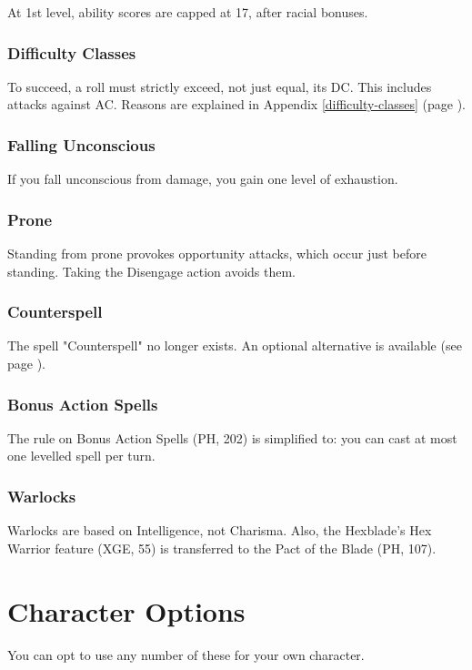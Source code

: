 \documentclass[letterpaper,twocolumn,openany,nodeprecatedcode,bg=print]{dndbook}
\newcommand{\pg}[1]{page \pageref{#1}}
\newcommand{\see}[1]{(see \pg{#1})}
\begin{document}
At 1st level, ability scores are capped at 17, after racial bonuses.

\subsection{Difficulty Classes}
To succeed, a roll must strictly exceed, not just equal, its DC. 
This includes attacks against AC. 
Reasons are explained in Appendix \ref{difficulty-classes} (\pg{difficulty-classes}).

\subsection{Falling Unconscious}
If you fall unconscious from damage, you gain one level of exhaustion.

\subsection{Prone}
Standing from prone provokes opportunity attacks, which occur just before standing. 
Taking the Disengage action avoids them.

\subsection{Counterspell}
The spell "Counterspell" no longer exists. 
An optional alternative is available \see{counterspell}.

\subsection{Bonus Action Spells}
The rule on Bonus Action Spells (PH, 202) is simplified to: 
you can cast at most one levelled spell per turn.

\subsection{Warlocks}
Warlocks are based on Intelligence, not Charisma. 
Also, the Hexblade's Hex Warrior feature (XGE, 55) is transferred to the Pact of the Blade (PH, 107).










\chapter{Character Options}
\noindent You can opt to use any number of these for your own character.
\end{document}
